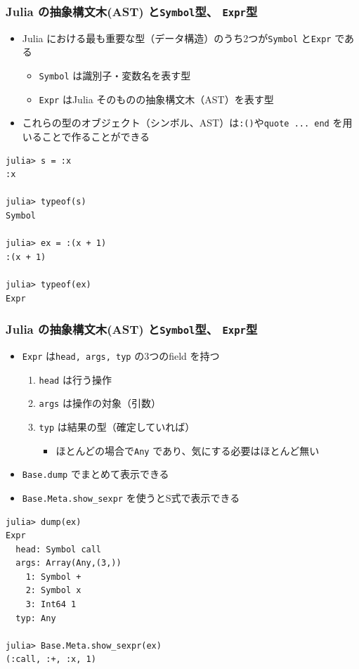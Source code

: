 \begin{frame}[containsverbatim]
\frametitle{Julia の抽象構文木(AST) と\texttt{Symbol}型、 \texttt{Expr}型}
\begin{itemize}
  \item Julia における最も重要な型（データ構造）のうち2つが\verb|Symbol| と\verb|Expr| である
    \begin{itemize}
      \item \verb|Symbol| は識別子・変数名を表す型
      \item \verb|Expr| はJulia そのものの抽象構文木（AST）を表す型
    \end{itemize}
  \item これらの型のオブジェクト（シンボル、AST）は\verb|:()|や\verb|quote ... end| を用いることで作ることができる
\end{itemize}
\begin{lstlisting}
julia> s = :x
:x

julia> typeof(s)
Symbol

julia> ex = :(x + 1)
:(x + 1)

julia> typeof(ex)
Expr
\end{lstlisting}
\end{frame}

\begin{frame}[containsverbatim]
\frametitle{Julia の抽象構文木(AST) と\texttt{Symbol}型、 \texttt{Expr}型}
\begin{itemize}
  \item \verb|Expr| は\verb|head, args, typ| の3つのfield を持つ
    \begin{enumerate}
      \item \verb|head| は行う操作
      \item \verb|args| は操作の対象（引数）
      \item \verb|typ| は結果の型（確定していれば）
        \begin{itemize}
          \item ほとんどの場合で\verb|Any| であり、気にする必要はほとんど無い
        \end{itemize}
    \end{enumerate}
  \item \verb|Base.dump| でまとめて表示できる
    \item \verb|Base.Meta.show_sexpr| を使うとS式で表示できる
\end{itemize}
\begin{lstlisting}
julia> dump(ex)
Expr
  head: Symbol call
  args: Array(Any,(3,))
    1: Symbol +
    2: Symbol x
    3: Int64 1
  typ: Any

julia> Base.Meta.show_sexpr(ex)
(:call, :+, :x, 1)
\end{lstlisting}
\end{frame}

